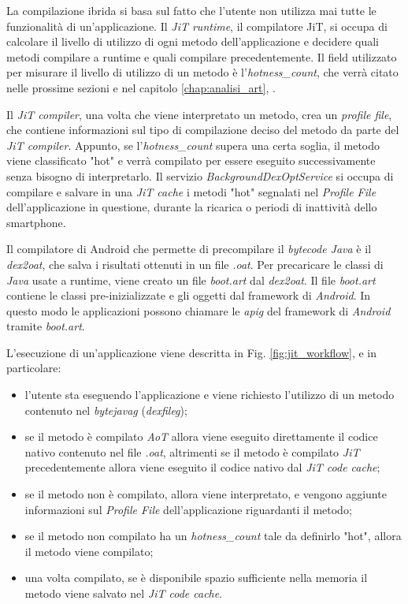 La compilazione ibrida si basa sul fatto che l'utente non utilizza mai tutte le funzionalità di un'applicazione.
Il \emph{JiT runtime}, il compilatore JiT, si occupa di calcolare il livello di utilizzo di ogni metodo dell'applicazione e decidere quali metodi compilare a runtime e quali compilare precedentemente. Il field utilizzato per misurare il livello di utilizzo di un metodo è l'\emph{hotness\_count}, che verrà citato nelle prossime sezioni e nel capitolo \ref{chap:analisi_art}, . 

Il \emph{JiT compiler}, una volta che viene interpretato un metodo, crea un \emph{profile file}, che contiene informazioni sul tipo di compilazione deciso del metodo da parte del \emph{JiT compiler}. Appunto, se l'\emph{hotness\_count} supera una certa soglia, il metodo viene classificato "hot" e verrà compilato per essere eseguito successivamente senza bisogno di interpretarlo. Il servizio \emph{BackgroundDexOptService} si occupa di compilare e salvare in una \emph{JiT cache} i metodi "hot" segnalati nel \emph{Profile File} dell'applicazione in questione, durante la ricarica o periodi di inattività dello smartphone.

Il compilatore di Android che permette di precompilare il \emph{bytecode Java} è il \emph{dex2oat}, che salva i risultati ottenuti in un file \emph{.oat}.
Per precaricare le classi di \emph{Java} usate a runtime, viene creato un file \emph{boot.art} dal \emph{dex2oat}. Il file \emph{boot.art} contiene le classi pre-inizializzate e gli oggetti dal framework di \emph{Android}. In questo modo le applicazioni possono chiamare le \emph{\gls{apig}} del framework di \emph{Android} tramite \emph{boot.art}.



L'esecuzione di un'applicazione viene descritta in Fig. \ref{fig:jit_workflow}, e in particolare:

\begin{itemize} 
    \item l'utente sta eseguendo l'applicazione e viene richiesto l'utilizzo di un metodo contenuto nel \emph{\gls{bytejavag}} (\emph{\gls{dexfileg}});
    \item se il metodo è compilato \emph{AoT} allora viene eseguito direttamente il codice nativo contenuto nel file \emph{.oat}, altrimenti se il metodo è compilato \emph{JiT} precedentemente allora viene eseguito il codice nativo dal \emph{JiT code cache};
    \item se il metodo non è compilato, allora viene interpretato, e vengono aggiunte informazioni sul    \emph{Profile File} dell'applicazione riguardanti il metodo;
    \item se il metodo non compilato ha un \emph{hotness\_count} tale da definirlo "hot", allora il metodo viene compilato;
    \item una volta compilato, se è disponibile spazio sufficiente nella memoria il metodo viene salvato nel \emph{JiT code cache}.
\end{itemize}


